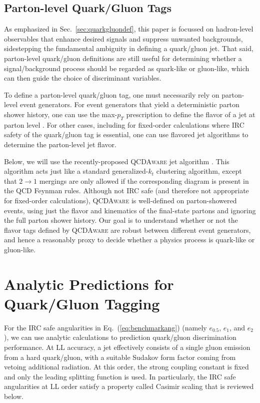 \documentclass[11pt,letterpaper]{article}
\DeclareRobustCommand{\Sec}[1]{Sec.~\ref{#1}}
\DeclareRobustCommand{\Eq}[1]{Eq.~(\ref{#1})}
\begin{document}
\subsection{Parton-level Quark/Gluon Tags}

As emphasized in \Sec{sec:quarkgluondef}, this paper is focussed on hadron-level observables that enhance desired signals and suppress unwanted backgrounds, sidestepping the fundamental ambiguity in defining a quark/gluon jet.  That said, parton-level quark/gluon definitions are still useful for determining whether a signal/background process should be regarded as quark-like or gluon-like, which can then guide the choice of discriminant variables.

To define a parton-level quark/gluon tag, one must necessarily rely on parton-level event generators.  For event generators that yield a deterministic parton shower history, one can use the max-$p_T$ prescription to define the flavor of a jet at parton level \cite{}.  For other cases, including for fixed-order calculations where IRC safety of the quark/gluon tag is essential, one can use flavored jet algorithms \cite{} to determine the parton-level jet flavor.

Below, we will use the recently-proposed \textsc{QCDAware} jet algorithm \cite{}.  This algorithm acts just like a standard generalized-$k_t$ clustering algorithm, except that $2 \to 1$ mergings are only allowed if the corresponding diagram is present in the QCD Feynman rules.  Although not IRC safe (and therefore not appropriate for fixed-order calculations), \textsc{QCDAware} is well-defined on parton-showered events, using just the flavor and kinematics of the final-state partons and ignoring the full parton shower history.  Our goal is to understand whether or not the flavor tags defined by \textsc{QCDAware} are robust between different event generators, and hence a reasonably proxy to decide whether a physics process is quark-like or gluon-like.

\section{Analytic Predictions for Quark/Gluon Tagging}
\label{sec:analytic}

For the IRC safe angularities in \Eq{eq:benchmarkang} (namely $e_{0.5}$, $e_1$, and $e_2$), we can use analytic calculations to prediction quark/gluon discrimination performance.  At LL accuracy, a jet effectively consists of a single gluon emission from a hard quark/gluon, with a suitable Sudakov form factor coming from vetoing additional radiation.  At this order, the strong coupling constant is fixed and only the leading splitting function is used.  In particularly, the IRC safe angularities at LL order satisfy a property called Casimir scaling that is reviewed below.
\end{document}
